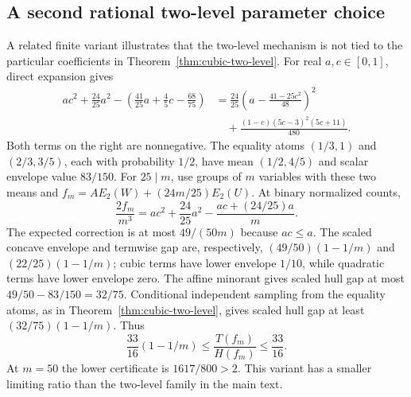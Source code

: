 \subsection{A second rational two-level parameter choice}
\label{app:two-level-variant}
A related finite variant illustrates that the two-level mechanism is not
tied to the particular coefficients in Theorem~\ref{thm:cubic-two-level}.
For real $a,c\in[0,1]$, direct expansion gives
\begin{equation}\label{eq:two-level-variant-scalar}
\begin{aligned}
 ac^2+\frac{24}{25}a^2
 -\left(\frac{41}{25}a+\frac45c-\frac{68}{75}\right)
 &=\frac{24}{25}\left(a-\frac{41-25c^2}{48}\right)^2\\
 &\quad+\frac{(1-c)(5c-3)^2(5c+11)}{480}.
\end{aligned}
\end{equation}
Both terms on the right are nonnegative. The equality atoms
$(1/3,1)$ and $(2/3,3/5)$, each with probability $1/2$, have mean
$(1/2,4/5)$ and scalar envelope value $83/150$.
For $25\mid m$, use groups of $m$ variables with these two means and
$f_m=A E_2(W)+(24m/25)E_2(U)$. At binary normalized counts,
\[
 \frac{2f_m}{m^3}=ac^2+\frac{24}{25}a^2
                   -\frac{ac+(24/25)a}{m}.
\]
The expected correction is at most $49/(50m)$ because $ac\le a$.
The scaled concave envelope and termwise gap are, respectively,
$(49/50)(1-1/m)$ and $(22/25)(1-1/m)$; cubic terms have lower envelope
$1/10$, while quadratic terms have lower envelope zero. The affine
minorant gives scaled hull gap at most $49/50-83/150=32/75$.
Conditional independent sampling from the equality atoms, as in
Theorem~\ref{thm:cubic-two-level}, gives scaled hull gap at least
$(32/75)(1-1/m)$. Thus
\[
 \frac{33}{16}(1-1/m)\le\frac{T(f_m)}{H(f_m)}\le\frac{33}{16}.
\]
At $m=50$ the lower certificate is $1617/800>2$. This variant has a
smaller limiting ratio than the two-level family in the main text.
